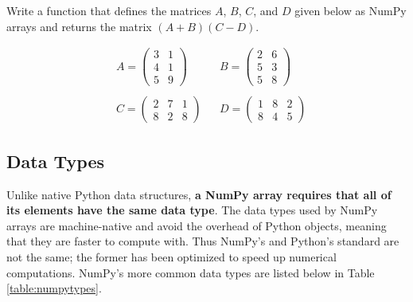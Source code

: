 \begin{problem} %
Write a function that defines the matrices $A$, $B$, $C$, and $D$ given below as NumPy arrays and returns the matrix $(A + B)(C - D)$.

\begin{align*}
&A = \left(\begin{array}{rr}
3 & 1 \\ 
4 & 1 \\
5 & 9 \end{array}\right)
&&
B = \left(\begin{array}{rr}
2 & 6 \\ 
5 & 3 \\
5 & 8 \end{array}\right)
\\ \\
&C = \left(\begin{array}{rrr}
2 & 7 & 1 \\ 
8 & 2 & 8 \end{array}\right)
&&
D = \left(\begin{array}{rrr}
1 & 8 & 2 \\ 
8 & 4 & 5 \end{array}\right)
\end{align*}
\label{prob:simple2}
\end{problem}

\subsection*{Data Types} %

Unlike native Python data structures, \textbf{a NumPy array requires that all of its elements have the same data type}. 
The data types used by NumPy arrays are machine-native and avoid the overhead of Python objects, meaning that they are faster to compute with.
Thus NumPy's  and Python's standard  are not the same; the former has been optimized to speed up numerical computations.
NumPy's more common data types are listed below in Table \ref{table:numpytypes}.

